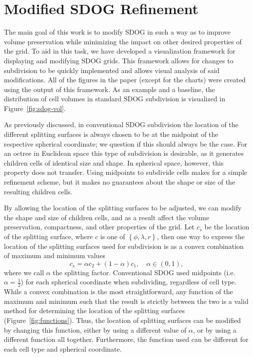 \section{Modified SDOG Refinement} \label{sec:method}


The main goal of this work is to modify SDOG in such a way as to improve volume preservation while minimizing the impact on other desired properties of the grid. To aid in this task, we have developed a visualization framework for displaying and modifying SDOG grids. This framework allows for changes to subdivision to be quickly implemented and allows visual analysis of said modifications. All of the figures in the paper (except for the charts) were created using the output of this framework. As an example and a baseline, the distribution of cell volumes in standard SDOG subdivision is visualized in Figure~\ref{fig:sdog-vol}.

As previously discussed, in conventional SDOG subdivision the location of the different splitting surfaces is always chosen to be at the midpoint of the respective spherical coordinate; we question if this should always be the case. For an octree in Euclidean space this type of subdivision is desirable, as it generates children cells of identical size and shape. In spherical space, however, this property does not transfer. Using midpoints to subdivide cells makes for a simple refinement scheme, but it makes no guarantees about the shape or size of the resulting children cells.



By allowing the location of the splitting surfaces to be adjusted, we can modify the shape and size of children cells, and as a result affect the volume preservation, compactness, and other properties of the grid. Let $c_{s}$ be the location of the splitting surface, where $c$ is one of $\left\lbrace \phi, \lambda, r \right\rbrace$, then one way to express the location of the splitting surfaces used for subdivision is as a convex combination of maximum and minimum values
%
\begin{equation} \label{eq:convex}
c_{s} = \alpha c_{2} + \left( 1-\alpha \right) c_{1}, \quad \alpha \in \left( 0, 1 \right),
\end{equation}
%
where we call $\alpha$ the splitting factor. Conventional SDOG used midpoints (i.e. $\alpha = \frac{1}{2}$) for each spherical coordinate when subdividing, regardless of cell type. While a convex combination is the most straightforward, any function of the maximum and minimum such that the result is strictly between the two is a valid method for determining the location of the splitting surfaces (Figure~\ref{fig:functions}). Thus, the location of splitting surfaces can be modified by changing this function, either by using a different value of $\alpha$, or by using a different function all together. Furthermore, the function used can be different for each cell type and spherical coordinate.

